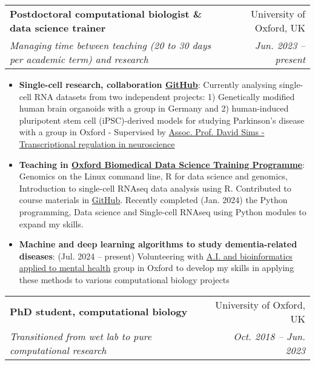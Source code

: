 \documentclass[legalpaper,11pt]{article}
\makeatletter
\newcommand{\resumeItem}[2]{
  \item\small{
    \textbf{#1}{: #2 \vspace{-2pt}}
  }
}
\newcommand{\resumeSubheading}[4]{
  \vspace{-1pt}\item
    \begin{tabular*}{0.97\textwidth}[t]{l@{\extracolsep{\fill}}r}
      \textbf{#1} & #2 \\
      \textit{\small#3} & \textit{\small #4} \\
    \end{tabular*}\vspace{-5pt}
}
\newcommand{\resumeItemListStart}{\begin{itemize}}
\newcommand{\resumeItemListEnd}{\end{itemize}\vspace{-5pt}}
\makeatother
\begin{document}
        \resumeSubheading
        {Postdoctoral computational biologist \& data science trainer}{University of Oxford, UK}{Managing time between teaching (20 to 30 days per academic term) and research}{Jun. 2023 -- present}
            \resumeItemListStart
                \resumeItem{Single-cell research, collaboration \href{https://github.com/liezeltamon/utils/tree/main/R}{GitHub}}{Currently analysing single-cell RNA datasets from two independent projects: 1) Genetically modified human brain organoids with a group in Germany and 2) human-induced pluripotent stem cell (iPSC)-derived models for studying Parkinson's disease with a group in Oxford - Supervised by \href{https://www.rdm.ox.ac.uk/people/david-sims}{Assoc. Prof. David Sims - Transcriptional regulation in neuroscience}}
                \resumeItem{Teaching in \href{https://www.imm.ox.ac.uk/research/units-and-centres/mrc-wimm-centre-for-computational-biology/training/oxford-biomedical-data-science-training-programme}{Oxford Biomedical Data Science Training Programme}}{Genomics on the Linux command line, R for data science and genomics, Introduction to single-cell RNAseq data analysis using R. Contributed to course materials in {\href{https://github.com/kevinrue/OBDS_slides}{GitHub}}. Recently completed (Jan. 2024) the Python programming, Data science and Single-cell RNAseq using Python modules to expand my skills.}
                 \resumeItem{Machine and deep learning algorithms to study dementia-related diseases}{ (Jul. 2024 -- present) Volunteering with \href{https://www.psych.ox.ac.uk/team/alejo-nevado-holgado}{A.I. and bioinformatics applied to mental health} group in Oxford to develop my skills in applying these methods to various computational biology projects}
            \resumeItemListEnd
        \resumeSubheading
        {PhD student, computational biology}{University of Oxford, UK}{Transitioned from wet lab to pure computational research}{Oct. 2018 -- Jun. 2023}
\end{document}
